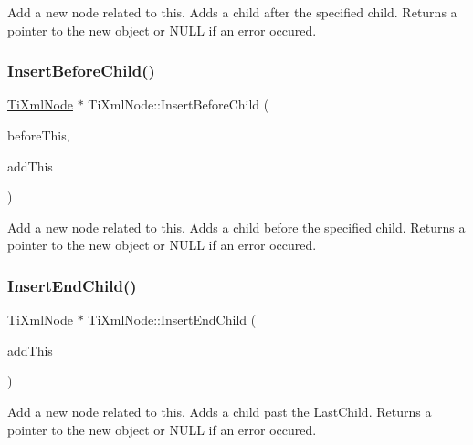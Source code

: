 Add a new node related to this. Adds a child after the specified child. Returns a pointer to the new object or N\+U\+LL if an error occured. \mbox{\label{class_ti_xml_node_a71e54e393336382bc9875f64aab5cb15}} 
\subsubsection{\texorpdfstring{Insert\+Before\+Child()}{InsertBeforeChild()}}
{\footnotesize\ttfamily \hyperlink{class_ti_xml_node}{Ti\+Xml\+Node} $\ast$ Ti\+Xml\+Node\+::\+Insert\+Before\+Child (\begin{DoxyParamCaption}\item[{\hyperlink{class_ti_xml_node}{Ti\+Xml\+Node} $\ast$}]{before\+This,  }\item[{const \hyperlink{class_ti_xml_node}{Ti\+Xml\+Node} \&}]{add\+This }\end{DoxyParamCaption})}

Add a new node related to this. Adds a child before the specified child. Returns a pointer to the new object or N\+U\+LL if an error occured. \mbox{\label{class_ti_xml_node_af287a913ce46d8dbf7ef24fec69bbaf0}} 
\subsubsection{\texorpdfstring{Insert\+End\+Child()}{InsertEndChild()}}
{\footnotesize\ttfamily \hyperlink{class_ti_xml_node}{Ti\+Xml\+Node} $\ast$ Ti\+Xml\+Node\+::\+Insert\+End\+Child (\begin{DoxyParamCaption}\item[{const \hyperlink{class_ti_xml_node}{Ti\+Xml\+Node} \&}]{add\+This }\end{DoxyParamCaption})}

Add a new node related to this. Adds a child past the Last\+Child. Returns a pointer to the new object or N\+U\+LL if an error occured. \mbox{\label{class_ti_xml_node_a67c3a02b797f08d9a31b2553661257e1}} 
